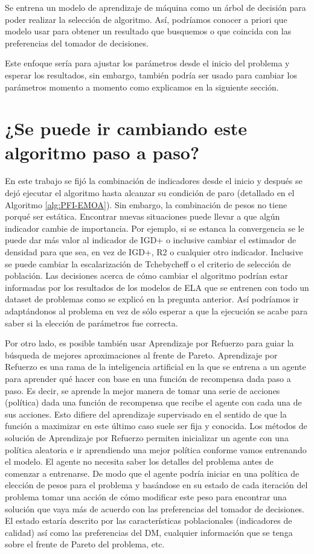 Se entrena un modelo de aprendizaje de máquina como un árbol de decisión para poder realizar la selección de algoritmo. Así, podríamos conocer a priori que modelo usar para obtener un resultado que busquemos o que coincida con las preferencias del tomador de decisiones. 

Este enfoque sería para ajustar los parámetros desde el inicio del problema y esperar los resultados, sin embargo, también podría ser usado para cambiar los parámetros momento a momento como explicamos en la siguiente sección. 

\section*{¿Se puede ir cambiando este algoritmo paso a paso?}

En este trabajo se fijó la combinación de indicadores desde el inicio y después se dejó ejecutar el algoritmo hasta alcanzar su condición de paro (detallado en el Algoritmo \ref{alg:PFI-EMOA}). Sin embargo, la combinación de pesos no tiene porqué ser estática. Encontrar nuevas situaciones puede llevar a que algún indicador cambie de importancia. Por ejemplo, si se estanca la convergencia se le puede dar más valor al indicador de IGD+ o inclusive cambiar el estimador de densidad para que sea, en vez de IGD+, R2 o cualquier otro indicador. Inclusive se puede cambiar la escalarización de Tchebycheff o el criterio de selección de población. Las decisiones acerca de cómo cambiar el algoritmo podrían estar informadas por los resultados de los modelos de ELA que se entrenen con todo un dataset de problemas como se explicó en la pregunta anterior. Así podríamos ir adaptándonos al problema en vez de sólo esperar a que la ejecución se acabe para saber si la elección de parámetros fue correcta.

Por otro lado, es posible también usar  Aprendizaje por Refuerzo \cite{Sutton1998} para guiar la búsqueda de mejores aproximaciones al frente de Pareto. Aprendizaje por Refuerzo es una rama de la inteligencia artificial en la que se entrena a un agente para aprender qué hacer con base en una función de recompensa dada paso a paso. Es decir, se aprende la mejor manera de tomar una serie de acciones (política) dada una función de recompensa que recibe el agente con cada una de sus acciones. Esto difiere del aprendizaje supervisado en el sentido de que la función a maximizar en este último caso suele ser fija y conocida. Los métodos de solución de Aprendizaje por Refuerzo permiten inicializar un agente con una política aleatoria e ir aprendiendo una mejor política conforme vamos entrenando el modelo. El agente no necesita saber los detalles del problema antes de comenzar a entrenarse. De modo que el agente podría iniciar en una política de elección de pesos para el problema y basándose en su estado de cada iteración del problema tomar una acción de cómo modificar este peso para encontrar una solución que vaya más de acuerdo con las preferencias del tomador de decisiones. El estado estaría descrito por las características poblacionales (indicadores de calidad) así como las preferencias del DM, cualquier información que se tenga sobre el frente de Pareto del problema, etc. 



